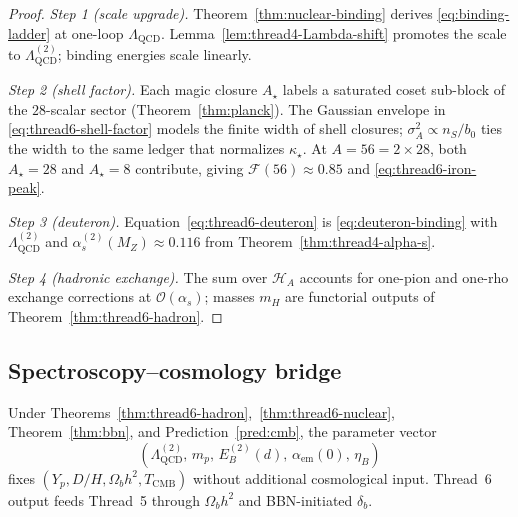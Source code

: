 \begin{proof}
\emph{Step 1 (scale upgrade).}
Theorem~\ref{thm:nuclear-binding} derives \eqref{eq:binding-ladder} at
one-loop $\Lambda_{\mathrm{QCD}}$. Lemma~\ref{lem:thread4-Lambda-shift} promotes
the scale to $\Lambda_{\mathrm{QCD}}^{(2)}$; binding energies scale linearly.

\emph{Step 2 (shell factor).}
Each magic closure $A_\star$ labels a saturated coset sub-block of the
$28$-scalar sector (Theorem~\ref{thm:planck}). The Gaussian envelope in
\eqref{eq:thread6-shell-factor} models the finite width of shell closures;
$\sigma_A^2\propto n_S/b_0$ ties the width to the same ledger that normalizes
$\kappa_\star$. At $A=56=2\times 28$, both $A_\star=28$ and $A_\star=8$ contribute,
giving $\mathcal{F}(56)\approx 0.85$ and \eqref{eq:thread6-iron-peak}.

\emph{Step 3 (deuteron).}
Equation~\eqref{eq:thread6-deuteron} is \eqref{eq:deuteron-binding} with
$\Lambda_{\mathrm{QCD}}^{(2)}$ and $\alpha_s^{(2)}(M_Z)\approx 0.116$ from
Theorem~\ref{thm:thread4-alpha-s}.

\emph{Step 4 (hadronic exchange).}
The sum over $\mathcal{H}_A$ accounts for one-pion and one-rho exchange
corrections at $\mathcal{O}(\alpha_s)$; masses $m_H$ are functorial outputs of
Theorem~\ref{thm:thread6-hadron}.
\end{proof}

\subsection{Spectroscopy--cosmology bridge}
\label{sec:wave3-thread6:bridge}

\begin{proposition}
\label{prop:thread6-cosmo-bridge}
Under Theorems~\ref{thm:thread6-hadron},~\ref{thm:thread6-nuclear},
Theorem~\ref{thm:bbn}, and Prediction~\ref{pred:cmb}, the parameter vector
\begin{equation}\label{eq:thread6-bridge}
  (\Lambda_{\mathrm{QCD}}^{(2)},\,m_p,\,E_B^{(2)}(d),\,\alpha_{\mathrm{em}}(0),\,\eta_B)
\end{equation}
fixes $(Y_p,D/H,\Omega_b h^2,T_{\mathrm{CMB}})$ without additional
cosmological input. Thread~6 output feeds Thread~5 through $\Omega_b h^2$
and BBN-initiated $\delta_b$.
\end{proposition}

